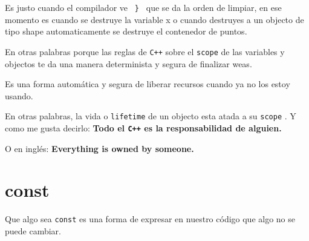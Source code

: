 \documentclass[12pt, fleqn]{report}                             %
\theoremstyle{break}                                            %
\newcommand{\textCode}[1]  { \texttt{#1} }                      %
\newcommand{\Cpp}{\ignorespaces\textCode{C++}}                  %
\begin{document}
            Es justo cuando el compilador ve \textCode{ \} } que se da la orden de limpiar,
            en ese momento es cuando se destruye la variable x o cuando destruyes a un objecto
            de tipo shape automaticamente se destruye el contenedor de puntos.
            
            En otras palabras porque las reglas de \Cpp sobre el \textCode{scope} de las variables
            y objectos te da una manera determinista y segura de finalizar weas.

            Es una forma automática y segura de liberar recursos cuando ya no los estoy usando.

            En otras palabras, la vida o \textCode{lifetime} de un objecto esta atada a su \textCode{scope}.
            Y como me gusta decirlo:
            \textbf{
                Todo el \Cpp es la responsabilidad de alguien.
            }

            O en inglés:
            \textbf{
                Everything is owned by someone.
            }

            \cite{ModernCppWhatYouNeedToKnow}



        \clearpage
        \section{const}


            Que algo sea \textCode{const} es una forma de expresar en nuestro código que
            algo no se puede cambiar.
            
\end{document}
